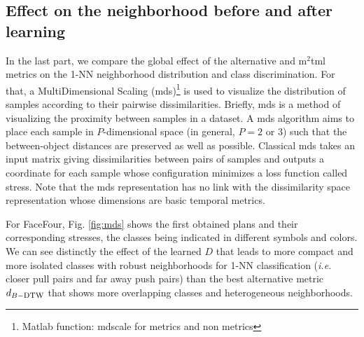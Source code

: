 \newpage
\subsection{Effect on the neighborhood before and after learning}
In the last part, we compare the global effect of the alternative and {\sc m}$^2${\sc tml} metrics  on the 1-NN neighborhood distribution and class discrimination. For that, a MultiDimensional Scaling ({\sc mds})\footnote{Matlab function: mdscale for metrics and non metrics} is used to visualize the distribution of samples according to their pairwise  dissimilarities. Briefly, {\sc mds} is a method of visualizing the proximity between samples in a dataset. A {\sc mds} algorithm aims to place each sample in $P$-dimensional space (in general, $P=2$ or $3$) such that the between-object distances are preserved as well as possible. Classical {\sc mds} takes an input matrix giving dissimilarities between pairs of samples and outputs a coordinate for each sample whose configuration minimizes a loss function called stress. Note that the {\sc mds} representation has no link with the dissimilarity space representation whose dimensions are basic temporal metrics.

For FaceFour, Fig. \ref{fig:mds} shows the first obtained plans and their corresponding stresses, the classes being indicated in different symbols and colors. We can see distinctly the effect of the learned  $D$ that leads to  more compact and more isolated classes with  robust  neighborhoods for 1-NN classification ({\it i.e.} closer pull pairs and far away push pairs) than  the best alternative metric $d_{B-\mbox{\sc dtw}}$ that shows more overlapping classes and heterogeneous neighborhoods.

